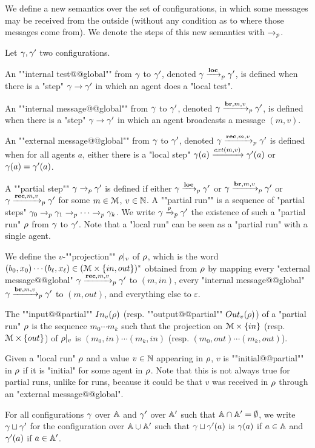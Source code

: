 We define a new semantics over the set of configurations, in which some messages may be received from the outside (without any condition as to where those messages come from). We denote the steps of this new semantics with $\xrightarrow{}_{p}$.  
\begin{definition}
	Let $\gamma, \gamma'$ two configurations. 

	An ""internal test@@global"" from $\gamma$ to $\gamma'$, denoted $\gamma \xrightarrow{\textbf{loc}}_{p} \gamma'$, is defined when there is a "step" $\gamma \xrightarrow{} \gamma'$ in which an agent does a "local test". 
	
	An ""internal message@@global"" from $\gamma$ to $\gamma'$, denoted $\gamma \xrightarrow{\textbf{br}, m, v}_{p} \gamma'$, is defined when there is a "step" $\gamma \xrightarrow{} \gamma'$ in which an agent broadcasts a message $(m,v)$. 
	
	An ""external message@@global"" from $\gamma$ to $\gamma'$, denoted $\gamma \xrightarrow{\textbf{rec}, m, v}_{p} \gamma'$ is defined when for all agents $a$, either there is a "local step" $\config(a) \extbr{m}{v} \config'(a)$ or $\gamma(a) = \gamma'(a)$.
	
	A ""partial step"" $\gamma \xrightarrow{}_{p} \gamma'$ is defined if either $\gamma \xrightarrow{\textbf{loc}}_{p} \gamma'$ or $\gamma \xrightarrow{\textbf{br}, m, v}_{p} \gamma'$ or $\gamma \xrightarrow{\textbf{rec}, m, v}_{p} \gamma'$ for some $m \in \mathcal{M}$, $v\in \mathbb{N}$.
	A ""partial run"" is a sequence of "partial steps" $\gamma_0 \xrightarrow{}_{p} \gamma_1  \xrightarrow{}_{p} \cdots \xrightarrow{}_{p} \gamma_k$. We write $\gamma \xrightarrow{\rho}_{p} \gamma'$ the existence of such a "partial run" $\rho$ from $\gamma$ to $\gamma'$.
	Note that a "local run" can be seen as a "partial run" with a single agent.

	We define the $v$-""projection"" ${\rho}|_{v}$ of $\rho$, which is the word $(b_0, x_0) \cdots (b_\ell, x_\ell) \in (\mathcal{M} \times \{in, out\})^*$ obtained from $\rho$ by mapping every "external message@@global" $\gamma \xrightarrow{\textbf{rec}, m, v}_{p} \gamma'$ to $(m, in)$, every "internal message@@global" $\gamma \xrightarrow{\textbf{br}, m, v}_{p} \gamma'$ to $(m, out)$, and everything else to $\varepsilon$.
	
	\AP The ""input@@partial"" $\vinput{v}{\run}$ (resp. ""output@@partial"" $\voutput{v}{\run}$) of a "partial run" $\rho$ is the sequence $m_0 \cdots m_k$ such that the projection on $\mathcal{M} \times \{in\}$ (resp. $\mathcal{M}\times \{out\}$) of ${\rho}|_{v}$ is $(m_0, in) \cdots (m_k, in)$ (resp. $(m_0, out)\cdots(m_k, out)$).
	
	\AP Given a "local run" $\rho$ and a value $v \in \mathbb{N}$ appearing in $\rho$, $v$ is ""initial@@partial"" in $\rho$ if it is "initial" for some agent in $\rho$. Note that this is not always true for partial runs, unlike for runs, because it could be that $v$ was received in $\rho$ through an "external message@@global". 

	For all configurations $\gamma$ over $\mathbb{A}$ and $\gamma'$ over $\mathbb{A}'$ such that $\mathbb{A} \cap \mathbb{A}' = \emptyset$, we write $\gamma \sqcup \gamma'$ for the configuration over $\mathbb{A} \cup \mathbb{A}'$ such that $\gamma \sqcup \gamma'(a)$ is $\gamma(a)$ if $a \in \mathbb{A}$ and $\gamma'(a)$ if $a \in \mathbb{A}'$. 

	\end{definition}

